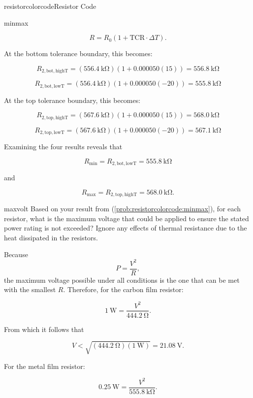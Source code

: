 \begin{mainquestion}{resistorcolorcode}{Resistor Code}
\begin{partquestion}{minmax}
\begin{answer}
\[
R=R_0\left(1+\mathrm{TCR}\cdot\Delta T\right).
\]

At the bottom tolerance boundary, this becomes:

\[
R_{2,\mathrm{bot,highT}}
=
\left(\qty{556.4}{\kilo\ohm}\right)
\left(1+0.000050\left(15\right)\right)
=
\qty{556.8}{\kilo\ohm}
\]

\[
R_{2,\mathrm{bot,lowT}}
=
\left(\qty{556.4}{\kilo\ohm}\right)
\left(1+0.000050\left(-20\right)\right)
=
\qty{555.8}{\kilo\ohm}
\]

At the top tolerance boundary, this becomes:

\[
R_{2,\mathrm{top,highT}}
=
\left(\qty{567.6}{\kilo\ohm}\right)
\left(1+0.000050\left(15\right)\right)
=
\qty{568.0}{\kilo\ohm}
\]

\[
R_{2,\mathrm{top,lowT}}
=
\left(\qty{567.6}{\kilo\ohm}\right)
\left(1+0.000050\left(-20\right)\right)
=
\qty{567.1}{\kilo\ohm}
\]

Examining the four results reveals that

\[
R_{\mathrm{min}}
=
R_{2,\mathrm{bot,lowT}}
=
\qty{555.8}{\kilo\ohm}
\]

and

\[
R_{\mathrm{max}}
=
R_{2,\mathrm{top,highT}}
=
\qty{568.0}{\kilo\ohm}.
\]
\end{answer}
\end{partquestion}

\begin{partquestion}{maxvolt}
{Based on your result from (\cref{prob:resistorcolorcode:minmax}), for each resistor, what is the maximum voltage that could be applied to ensure the stated power rating is not exceeded? Ignore any effects of thermal resistance due to the heat dissipated in the resistors.}

\begin{answer}

Because
\[
P=\frac{V^2}{R},
\]
the maximum voltage possible under all conditions is the one that can be met with the smallest $R$. Therefore, for the carbon film resistor:

\[
\qty{1}{\watt}
=
\frac{V^2}{\qty{444.2}{\ohm}}.
\]

From which it follows that

\[
V
<
\sqrt{\left(\qty{444.2}{\ohm}\right)\left(\qty{1}{\watt}\right)}
=
\qty{21.08}{\volt}.
\]

For the metal film resistor:

\[
\qty{0.25}{\watt}
=
\frac{V^2}{\qty{555.8}{\kilo\ohm}}.
\]


\end{answer}
\end{partquestion}
\end{mainquestion}
